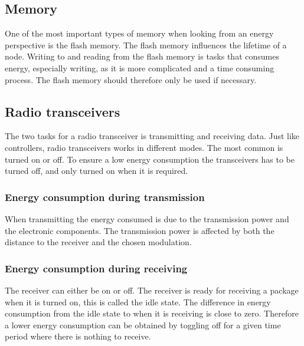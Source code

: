 \subsection{Memory}
One of the most important types of memory when looking from an energy perspective is the flash memory.
The flash memory influences the lifetime of a node. Writing to and reading from the flash memory is tasks that consumes energy, especially writing, as it is more complicated and a time consuming process. The flash memory should therefore only be used if necessary. 
 
\subsection{Radio transceivers}
The two tasks for a radio transceiver is transmitting and receiving data. Just like controllers, radio transceivers works in different modes. The most common is turned on or off. To ensure a low energy consumption the transceivers has to be turned off, and only turned on when it is required.
  
\subsubsection*{Energy consumption during transmission}
When transmitting the energy consumed is due to the transmission power and the electronic components. The transmission power is affected by both the distance to the receiver and the chosen modulation.

\subsubsection*{Energy consumption during receiving}
The receiver can either be on or off. The receiver is ready for receiving a package when it is turned on, this is called the idle state. The difference in energy consumption from the idle state to when it is receiving is close to zero. Therefore a lower energy consumption can be obtained by toggling off for a given time period where there is nothing to receive.